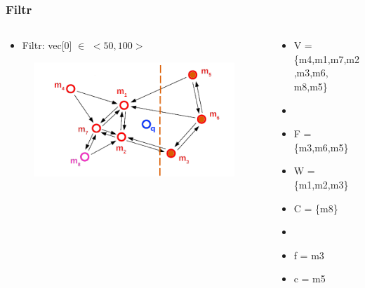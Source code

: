 \documentclass{beamer}
\begin{document}
	\begin{frame}
		\frametitle{Filtr}
		\begin{columns}[T] %
			\begin{column}{.6\textwidth}
				\begin{itemize}
					\item[] Filtr: vec[0] $\in$ $<50,100>$
				\end{itemize}
				\begin{figure}
					\includegraphics[scale=0.3]{figures/Filtry_b6.png}
				\end{figure}
			\end{column}%
			\hfill%
			\begin{column}{.4\textwidth}
				\begin{itemize}
					\item V = \{m4,m1,m7,m2,m3,m6, m8,m5\}
					\item[]
					\item F = \{m3,m6,m5\}
					\item W = \{m1,m2,m3\}
					\item C = \{m8\}
					\item[]
					\item f = m3
					\item c = m5
				\end{itemize}
			\end{column}%
		\end{columns}
	\end{frame}
\end{document}
